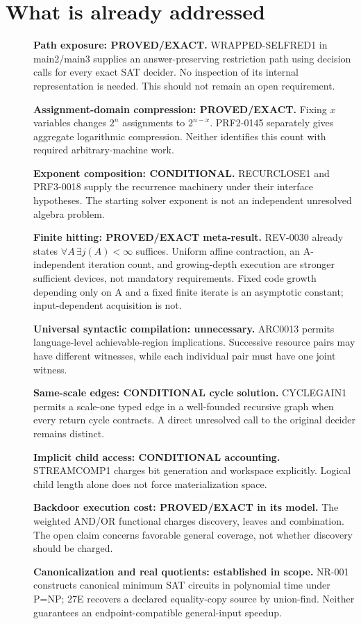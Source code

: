 \documentclass[11pt]{article}
\begin{document}
\section{What is already addressed}
\begin{description}
\item[] \textbf{Path exposure: PROVED/EXACT.} WRAPPED-SELFRED1 in main2/main3 supplies an answer-preserving restriction path using decision calls for every exact SAT decider. No inspection of its internal representation is needed. This should not remain an open requirement.
\item[] \textbf{Assignment-domain compression: PROVED/EXACT.} Fixing $x$ variables changes $2^n$ assignments to $2^{n-x}$. PRF2-0145 separately gives aggregate logarithmic compression. Neither identifies this count with required arbitrary-machine work.
\item[] \textbf{Exponent composition: CONDITIONAL.} RECURCLOSE1 and PRF3-0018 supply the recurrence machinery under their interface hypotheses. The starting solver exponent is not an independent unresolved algebra problem.
\item[] \textbf{Finite hitting: PROVED/EXACT meta-result.} REV-0030 already states $\forall A\,\exists j(A)<\infty$ suffices. Uniform affine contraction, an A-independent iteration count, and growing-depth execution are stronger sufficient devices, not mandatory requirements. Fixed code growth depending only on A and a fixed finite iterate is an asymptotic constant; input-dependent acquisition is not.
\item[] \textbf{Universal syntactic compilation: unnecessary.} ARC0013 permits language-level achievable-region implications. Successive resource pairs may have different witnesses, while each individual pair must have one joint witness.
\item[] \textbf{Same-scale edges: CONDITIONAL cycle solution.} CYCLEGAIN1 permits a scale-one typed edge in a well-founded recursive graph when every return cycle contracts. A direct unresolved call to the original decider remains distinct.
\item[] \textbf{Implicit child access: CONDITIONAL accounting.} STREAMCOMP1 charges bit generation and workspace explicitly. Logical child length alone does not force materialization space.
\item[] \textbf{Backdoor execution cost: PROVED/EXACT in its model.} The weighted AND/OR functional charges discovery, leaves and combination. The open claim concerns favorable general coverage, not whether discovery should be charged.
\item[] \textbf{Canonicalization and real quotients: established in scope.} NR-001 constructs canonical minimum SAT circuits in polynomial time under P=NP; 27E recovers a declared equality-copy source by union-find. Neither guarantees an endpoint-compatible general-input speedup.
\end{description}
\end{document}
